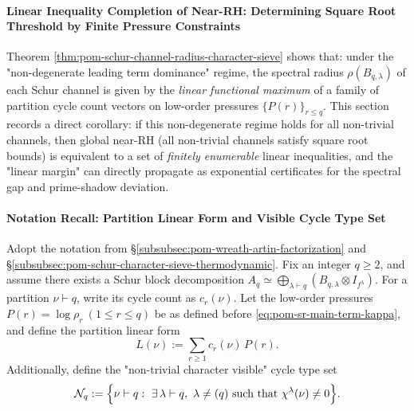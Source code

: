 
\paragraph{Linear Inequality Completion of Near-RH: Determining Square Root Threshold by Finite Pressure Constraints}
Theorem \ref{thm:pom-schur-channel-radius-character-sieve} shows that: under the "non-degenerate leading term dominance" regime,
the spectral radius \(\rho(B_{q,\lambda})\) of each Schur channel is given by the \emph{linear functional maximum} of a family of partition cycle count vectors on low-order pressures \(\{P(r)\}_{r\le q}\).
This section records a direct corollary: if this non-degenerate regime holds for all non-trivial channels, then global near-RH (all non-trivial channels satisfy square root bounds) is equivalent to a set of \emph{finitely enumerable} linear inequalities,
and the "linear margin" can directly propagate as exponential certificates for the spectral gap and prime-shadow deviation.

\paragraph{Notation Recall: Partition Linear Form and Visible Cycle Type Set}
Adopt the notation from \S\ref{subsubsec:pom-wreath-artin-factorization} and
\S\ref{subsubsec:pom-schur-character-sieve-thermodynamic}.
Fix an integer \(q\ge2\), and assume there exists a Schur block decomposition
\(
A_q\simeq\bigoplus_{\lambda\vdash q}(B_{q,\lambda}\otimes I_{f^\lambda})
\).
For a partition \(\nu\vdash q\), write its cycle count as \(c_r(\nu)\).
Let the low-order pressures \(P(r)=\log\rho_r\ (1\le r\le q)\) be as defined before \eqref{eq:pom-sr-main-term-kappa},
and define the partition linear form
\[
L(\nu):=\sum_{r\ge1} c_r(\nu)\,P(r).
\]
Additionally, define the "non-trivial character visible" cycle type set
\[
\mathcal{N}_q
:=
\Bigl\{\nu\vdash q:\ \exists\,\lambda\vdash q,\ \lambda\neq(q)\ \text{such that}\ \chi^\lambda(\nu)\neq0\Bigr\}.
\]

